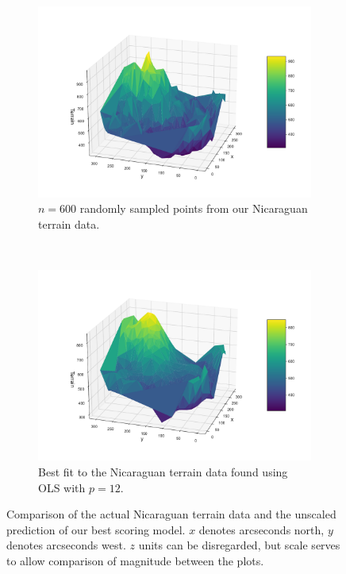 \documentclass[twocolumn,english,notitlepage]{article}
\begin{document}
        \begin{figure} [ht]
            \begin{subfigure}{\linewidth}
                \centering
                \includegraphics[width=\linewidth]{Nica_test_plot.pdf}
                \caption{$n=600$ randomly sampled points from our Nicaraguan terrain data.}
                \label{res:subfig:Nica_test}
            \end{subfigure}
            \\
            \begin{subfigure}{\linewidth}
                \centering
                \includegraphics[width=\linewidth]{Nica_predict_plot.pdf}
                \caption{Best fit to the Nicaraguan terrain data found using OLS with $p=12$.}
                \label{res:subfig:Nica_predict}
            \end{subfigure}
            \caption{Comparison of the actual Nicaraguan terrain data and the unscaled prediction of our best scoring model. $x$ denotes arcseconds north, $y$ denotes arcseconds west. $z$ units can be disregarded, but scale serves to allow comparison of magnitude between the plots.}
            \label{res:fig:Nica_terrain}
        \end{figure}
\end{document}
